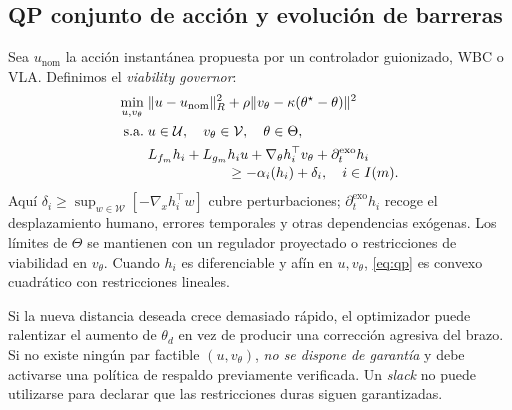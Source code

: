 \documentclass[10pt,a4paper,twocolumn]{article}
\newcommand{\calU}{\mathcal{U}}
\newcommand{\calW}{\mathcal{W}}
\newcommand{\calV}{\mathcal{V}}
\begin{document}
\subsection{QP conjunto de acción y evolución de barreras}
Sea $u_{\mathrm{nom}}$ la acción instantánea propuesta por un controlador guionizado, WBC o VLA. Definimos el \emph{viability governor}:
\begin{align}
 \min_{u,v_\theta}\; & \|u-u_{\mathrm{nom}}\|_R^2+
 \rho\|v_\theta-\kappa(\theta^\star-\theta)\|^2 \label{eq:qp}\\
 \text{s.a.}\; & u\in\calU,\quad v_\theta\in\calV,\quad\theta\in\Theta, \nonumber\\
 & L_{f_m}h_i+L_{g_m}h_i u+\nabla_\theta h_i^\top v_\theta
 +\partial_t^{\mathrm{exo}}h_i \nonumber\\[-2pt]
 &\hspace{20mm}\ge-\alpha_i(h_i)+\delta_i,
 \quad i\in I(m). \nonumber
\end{align}
Aquí $\delta_i\ge\sup_{w\in\calW}[-\nabla_xh_i^\top w]$ cubre perturbaciones; $\partial_t^{\mathrm{exo}}h_i$ recoge el desplazamiento humano, errores temporales y otras dependencias exógenas. Los límites de $\Theta$ se mantienen con un regulador proyectado o restricciones de viabilidad en $v_\theta$. Cuando $h_i$ es diferenciable y afín en $u,v_\theta$, \eqref{eq:qp} es convexo cuadrático con restricciones lineales.

Si la nueva distancia deseada crece demasiado rápido, el optimizador puede ralentizar el aumento de $\theta_d$ en vez de producir una corrección agresiva del brazo. Si no existe ningún par factible $(u,v_\theta)$, \emph{no se dispone de garantía} y debe activarse una política de respaldo previamente verificada. Un \emph{slack} no puede utilizarse para declarar que las restricciones duras siguen garantizadas.
\end{document}

